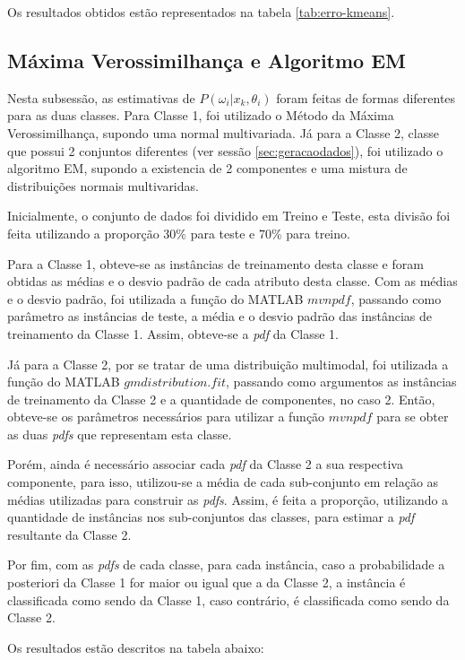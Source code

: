 Os resultados obtidos estão representados na tabela \ref{tab:erro-kmeans}.


\subsection{Máxima Verossimilhança e Algoritmo EM}
\label{subsec:exp-mle-em}

Nesta subsessão, as estimativas de $P(\omega_i | x_k, \theta_i)$ foram feitas de formas diferentes para as duas classes. Para Classe 1, foi utilizado o Método da Máxima Verossimilhança, supondo uma normal multivariada. Já para a Classe 2, classe que possui 2 conjuntos diferentes (ver sessão \ref{sec:geracaodados}), foi utilizado o algoritmo EM, supondo a existencia de 2 componentes e uma mistura de distribuições normais multivaridas.

Inicialmente, o conjunto de dados foi dividido em Treino e Teste, esta divisão foi feita utilizando a proporção 30\% para teste e 70\% para treino.

Para a Classe 1, obteve-se as instâncias de treinamento desta classe e foram obtidas as médias e o desvio padrão de cada atributo desta classe. Com as médias e o desvio padrão, foi utilizada a função do MATLAB $mvnpdf$, passando como parâmetro as instâncias de teste, a média e o desvio padrão das instâncias de treinamento da Classe 1. Assim, obteve-se a \textit{pdf} da Classe 1.

Já para a Classe 2, por se tratar de uma distribuição multimodal, foi utilizada a função do MATLAB $gmdistribution.fit$, passando como argumentos as instâncias de treinamento da Classe 2 e a quantidade de componentes, no caso 2. Então, obteve-se os parâmetros necessários para utilizar a função $mvnpdf$ para se obter as duas \textit{pdfs} que representam esta classe.

Porém, ainda é necessário associar cada \textit{pdf} da Classe 2 a sua respectiva componente, para isso, utilizou-se a média de cada sub-conjunto em relação as médias utilizadas para construir as \textit{pdfs}. Assim, é feita a proporção, utilizando a quantidade de instâncias nos sub-conjuntos das classes, para estimar a \textit{pdf} resultante da Classe 2.

Por fim, com as \textit{pdfs} de cada classe, para cada instância, caso a probabilidade a posteriori da Classe 1 for maior ou igual que a da Classe 2, a instância é classificada como sendo da Classe 1, caso contrário, é classificada como sendo da Classe 2.

Os resultados estão descritos na tabela abaixo:

